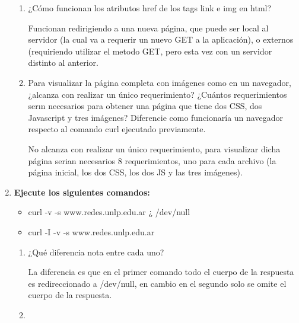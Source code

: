 \documentclass[a4paper,10pt]{article}
\begin{document}
\begin{enumerate}
\begin{enumerate}
            \item ¿Cómo funcionan los atributos href de los tags link e img en html?
            
            Funcionan redirigiendo a una nueva página, que puede ser local al servidor (la cual va a requerir un nuevo GET a la aplicación), o externos (requiriendo utilizar el metodo GET, pero esta vez con un servidor distinto al anterior.
            
            \item Para visualizar la página completa con imágenes como en un navegador, ¿alcanza con realizar un único requerimiento? ¿Cuántos requerimientos serın necesarios para obtener una página que tiene dos CSS, dos Javascript y tres imágenes? Diferencie como funcionaría un navegador respecto al comando curl ejecutado previamente. 
            
            No alcanza con realizar un único requerimiento, para visualizar dicha página serian necesarios 8 requerimientos, uno para cada archivo (la página inicial, los dos CSS, los dos JS y las tres imágenes).
            
        \end{enumerate}
        
    \item \textbf{Ejecute los siguientes comandos:}
        \begin{itemize}
            \item curl -v -s www.redes.unlp.edu.ar ¿ /dev/null
            \item curl -I -v -s www.redes.unlp.edu.ar
        \end{itemize}
        
        \begin{enumerate}
            \item ¿Qué diferencia nota entre cada uno?
            
            La diferencia es que en el primer comando todo el cuerpo de la respuesta es redireccionado a /dev/null, en cambio en el segundo solo se omite el cuerpo de la respuesta.
            
            \item 
        \end{enumerate}
        
\end{enumerate}
\end{document}
